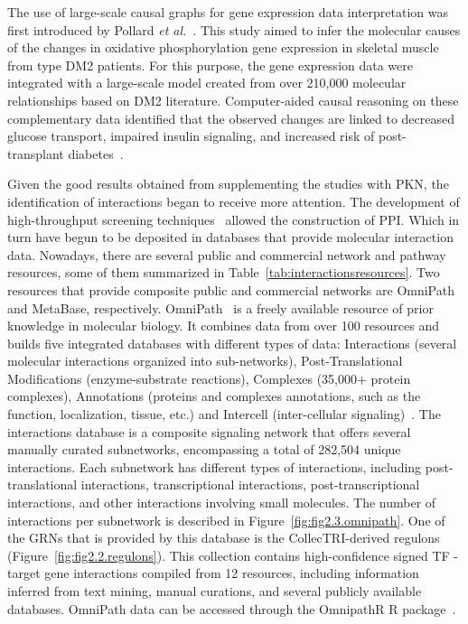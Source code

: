 The use of large-scale causal graphs for gene expression data interpretation was first introduced by Pollard \textit{et al.}~\cite{RN131, RN135}. This study aimed to infer the molecular causes of the changes in oxidative phosphorylation gene expression in skeletal muscle from type \gls{DM2} patients. For this purpose, the gene expression data were integrated with a large-scale model created from over 210,000 molecular relationships based on \gls{DM2} literature. 
Computer-aided causal reasoning on these complementary data identified that the observed changes are linked to decreased glucose transport, impaired insulin signaling, and increased risk of post-transplant diabetes~\cite{RN131}.

Given the good results obtained from supplementing the studies with \gls{PKN}, the identification of interactions began to receive more attention. 
The development of high-throughput screening techniques~\cite{RN138} allowed the construction of \gls{PPI}. Which in turn have begun to be deposited in databases that provide molecular interaction data.
Nowadays, there are several public and commercial network and pathway resources, some of them summarized in Table~\ref{tab:interactionsresources}.
Two resources that provide composite public and commercial networks are OmniPath and MetaBase, respectively. OmniPath~\cite{RN91} is a freely available resource of prior knowledge in molecular biology. 
It combines data from over 100 resources and builds five integrated databases with different types of data: Interactions (several molecular interactions organized into sub-networks), Post-Translational Modifications (enzyme-substrate reactions), Complexes (35,000+ protein complexes), Annotations (proteins and complexes annotations, such as the function, localization, tissue, etc.) and Intercell (inter-cellular signaling)~\cite{RN91}. 
The interactions database is a composite signaling network that offers several manually curated subnetworks, encompassing a total of 282,504 unique interactions. 
Each subnetwork has different types of interactions, including post-translational interactions, transcriptional interactions, post-transcriptional interactions, and other interactions involving small molecules. 
The number of interactions per subnetwork is described in Figure~\ref{fig:fig2.3.omnipath}. One of the GRNs that is provided by this database is the CollecTRI-derived regulons~\cite{RN145} (Figure~\ref{fig:fig2.2.regulons}). 
This collection contains high-confidence signed \gls{TF} - target gene interactions compiled from 12 resources, including information inferred from text mining, manual curations, and several publicly available databases.
OmniPath data can be accessed through the OmnipathR \gls{R} package~\cite{RN92}.

